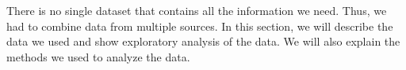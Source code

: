 
There is no single dataset that contains all the information we need. Thus, we had to combine data from multiple sources. In this section, we will describe the data we used 
and show exploratory analysis of the data. We will also explain the methods we used to analyze the data.

% 

